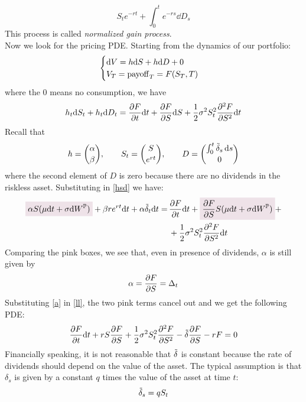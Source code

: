\begin{equation}
    S_te^{-rt} + \int_0^t e^{-rs}\dd D_s
\end{equation}
This process is called \emph{normalized gain process}. \\
Now we look for the pricing PDE. Starting from the dynamics of our portfolio:
\begin{equation}
    \begin{cases}
    \dd V = h \dd S + h \dd D + 0 \\
    V_T = \operatorname{payoff}_T = F(S_T,T)
    \end{cases}
\end{equation}
where the 0 means no consumption, we have
\begin{equation}\label{hsd}
    h_t \dd S_t + h_t \dd D_t = \pdv{F}{t}\dd t + \pdv{F}{S}\dd S + \dfrac{1}{2}\sigma^2S_t^2\pdv[2]{F}{S}\dd t
\end{equation}
Recall that 
\begin{equation}
    h = \binom{\alpha}{\beta}, \qquad S_t = \binom{S}{e^{rt}}, \qquad D = \binom{\int^t_0\Tilde{\delta}_s\,\dd s}{0}
\end{equation}
where the second element of $D$ is zero because there are no dividends in the riskless asset. Substituting in \eqref{hsd} we have:
\begin{align}\label{ll}
    \notag\hlc{mypink}{\alpha S(\mu\dd t + \sigma\dd W^{\Pmeas})}+\beta re^{rt}\dd t + \alpha\Tilde{\delta}_t\dd t =\, &\pdv{F}{t}\dd t + \hlc{mypink}{\pdv{F}{S}S(\mu\dd t + \sigma\dd W^{\Pmeas})} + \\
    &+ \dfrac{1}{2}\sigma^2S_t^2\pdv[2]{F}{S}\dd t
\end{align}
Comparing the pink boxes, we see that, even in presence of dividends, $\alpha$ is still given by
\begin{equation}\label{a}
    \alpha = \pdv{F}{S} = \Delta_t 
\end{equation}
Substituting \eqref{a} in \eqref{ll}, the two pink terms cancel out and we get the following PDE:
\begin{equation}
    \pdv{F}{t}\dd t + rS\pdv{F}{S} + \dfrac{1}{2}\sigma^2S_t^2\pdv[2]{F}{S} - \Tilde{\delta}\pdv{F}{S} - rF = 0 
\end{equation}
Financially speaking, it is not reasonable that $\Tilde{\delta}$ is constant because the rate of dividends should depend on the value of the asset. The typical assumption is that $\delta_s$ is given by a constant $q$ times the value of the asset at time $t$:
\begin{equation}
    \Tilde{\delta}_s = qS_t 
\end{equation}
